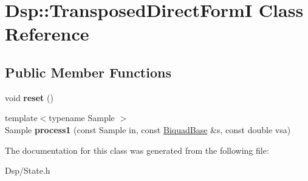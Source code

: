 \hypertarget{classDsp_1_1TransposedDirectFormI}{\section{Dsp\-:\-:Transposed\-Direct\-Form\-I Class Reference}
\label{classDsp_1_1TransposedDirectFormI}
}
\subsection*{Public Member Functions}
\begin{DoxyCompactItemize}
\item 
\hypertarget{classDsp_1_1TransposedDirectFormI_ad554adaba9c7bf48518395e14185e366}{void {\bfseries reset} ()}\label{classDsp_1_1TransposedDirectFormI_ad554adaba9c7bf48518395e14185e366}

\item 
\hypertarget{classDsp_1_1TransposedDirectFormI_aaf19f420106f008b1dad94636d607f3d}{{\footnotesize template$<$typename Sample $>$ }\\Sample {\bfseries process1} (const Sample in, const \hyperlink{classDsp_1_1BiquadBase}{Biquad\-Base} \&s, const double vsa)}\label{classDsp_1_1TransposedDirectFormI_aaf19f420106f008b1dad94636d607f3d}

\end{DoxyCompactItemize}


The documentation for this class was generated from the following file\-:\begin{DoxyCompactItemize}
\item 
Dsp/State.\-h\end{DoxyCompactItemize}
